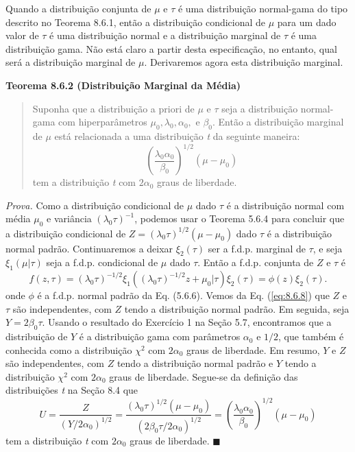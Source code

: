 Quando a distribuição conjunta de $\mu$ e $\tau$ é uma distribuição normal-gama do tipo descrito no Teorema 8.6.1, então a distribuição condicional de $\mu$ para um dado valor de $\tau$ é uma distribuição normal e a distribuição marginal de $\tau$ é uma distribuição gama. Não está claro a partir desta especificação, no entanto, qual será a distribuição marginal de $\mu$. Derivaremos agora esta distribuição marginal.

\vspace{1em}
\noindent\textbf{Teorema 8.6.2 (Distribuição Marginal da Média)}
\begin{quote}
    Suponha que a distribuição a priori de $\mu$ e $\tau$ seja a distribuição normal-gama com hiperparâmetros $\mu_0, \lambda_0, \alpha_0,$ e $\beta_0$. Então a distribuição marginal de $\mu$ está relacionada a uma distribuição \textit{t} da seguinte maneira:
    \[
    \left(\frac{\lambda_0\alpha_0}{\beta_0}\right)^{1/2}(\mu - \mu_0)
    \]
    tem a distribuição \textit{t} com $2\alpha_0$ graus de liberdade.
\end{quote}
\vspace{1em}

\noindent\textit{Prova.} Como a distribuição condicional de $\mu$ dado $\tau$ é a distribuição normal com média $\mu_0$ e variância $(\lambda_0\tau)^{-1}$, podemos usar o Teorema 5.6.4 para concluir que a distribuição condicional de $Z = (\lambda_0\tau)^{1/2}(\mu - \mu_0)$ dado $\tau$ é a distribuição normal padrão. Continuaremos a deixar $\xi_2(\tau)$ ser a f.d.p. marginal de $\tau$, e seja $\xi_1(\mu|\tau)$ seja a f.d.p. condicional de $\mu$ dado $\tau$. Então a f.d.p. conjunta de $Z$ e $\tau$ é
\begin{equation} \label{eq:8.6.8}
    f(z, \tau) = (\lambda_0\tau)^{-1/2}\xi_1((\lambda_0\tau)^{-1/2}z + \mu_0|\tau)\xi_2(\tau) = \phi(z)\xi_2(\tau).
\end{equation}
onde $\phi$ é a f.d.p. normal padrão da Eq. (5.6.6). Vemos da Eq. (\ref{eq:8.6.8}) que $Z$ e $\tau$ são independentes, com $Z$ tendo a distribuição normal padrão. Em seguida, seja $Y = 2\beta_0\tau$. Usando o resultado do Exercício 1 na Seção 5.7, encontramos que a distribuição de $Y$ é a distribuição gama com parâmetros $\alpha_0$ e $1/2$, que também é conhecida como a distribuição $\chi^2$ com $2\alpha_0$ graus de liberdade. Em resumo, $Y$ e $Z$ são independentes, com $Z$ tendo a distribuição normal padrão e $Y$ tendo a distribuição $\chi^2$ com $2\alpha_0$ graus de liberdade. Segue-se da definição das distribuições \textit{t} na Seção 8.4 que
\begin{equation} \label{eq:8.6.9}
    U = \frac{Z}{(Y/2\alpha_0)^{1/2}} = \frac{(\lambda_0\tau)^{1/2}(\mu - \mu_0)}{(2\beta_0\tau / 2\alpha_0)^{1/2}} = \left(\frac{\lambda_0\alpha_0}{\beta_0}\right)^{1/2}(\mu - \mu_0)
\end{equation}
tem a distribuição \textit{t} com $2\alpha_0$ graus de liberdade. \hfill $\blacksquare$

